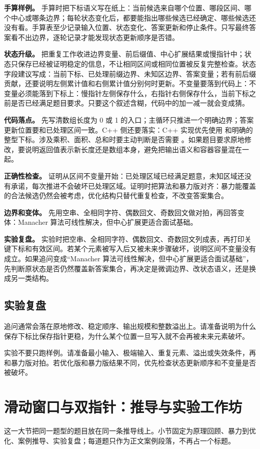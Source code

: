 \textbf{手算样例。} 手算时把下标语义写在纸上：当前候选来自哪个位置、哪段区间、哪个中心或哪条边界；每轮状态变化后，都要能指出哪些候选已经确定、哪些候选还没有看。手算表至少记录输入位置、状态变化、答案更新和停止条件。只写最终答案看不出边界，逐轮记录才能发现状态更新顺序是否错。

\textbf{状态升级。} 把重复工作收进边界变量、前后缀值、中心扩展结果或慢指针中；状态只保存已经被证明稳定的信息，不让相同区间或相同位置被反复完整检查。状态字段建议写成：当前下标、已处理前缀边界、未知区边界、答案变量；若有前后缀贡献，还要说明左侧累计值和右侧累计值分别何时更新。不变量要落到代码上：不变量必须能落到下标上：慢指针左侧保存什么，右指针右侧保存什么，当前下标之前是否已经满足题目要求。只要这个叙述含糊，代码中的加一减一就会变成猜。

\textbf{代码落点。} 先写清数组长度为 0 或 1 的入口；主循环只推进一个明确边界；答案更新位置要和已处理区间一致。C++ 侧还要落实：C++ 实现优先使用  和明确的整型下标。涉及乘积、面积、总和时要主动判断是否需要 。如果题目要求原地修改，要说明返回值表示新长度还是数组本身，避免把输出语义和容器容量混在一起。

\textbf{正确性检查。} 证明从区间不变量开始：已处理区域已经满足题意，未知区域还没有承诺，每次推进不会破坏已处理区域。证明时把算法和暴力版对齐：暴力能覆盖的合法候选仍然会被考虑，优化结构只替代重复检查，不改变答案集合。

\textbf{边界和变体。} 先用空串、全相同字符、偶数回文、奇数回文做对拍，再回答变体：Manacher 算法可线性解决，但中心扩展更适合面试基础。

\textbf{实验复盘。} 实验时把空串、全相同字符、偶数回文、奇数回文列成表，再打印关键下标和有效区间。若某个元素被写入后又被未来步骤破坏，说明区间不变量没有成立。如果追问变成“Manacher 算法可线性解决，但中心扩展更适合面试基础”，先判断原状态是否仍然覆盖新答案集合，再决定是微调边界、改状态语义，还是换成另一类结构。

\subsection{实验复盘}

追问通常会落在原地修改、稳定顺序、输出规模和整数溢出上。请准备说明为什么保存下标比保存指针更稳，为什么某个位置一旦写入就不会再被未来元素破坏。

实验不要只跑样例。请准备最小输入、极端输入、重复元素、溢出或失效条件，再和暴力版对拍。若优化版和暴力版结果不同，优先检查状态更新顺序和不变量是否被破坏。

\section{滑动窗口与双指针：推导与实验工作坊}
这一大节把同一题型的题目放在同一条推导线上。小节固定为原理回顾、暴力到优化、案例推导、实验复盘；每道题只作为正文案例段落，不再占一个标题。

